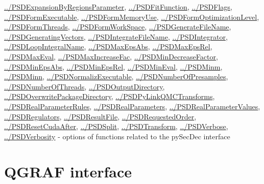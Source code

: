 \documentclass[../FeynHelpersManual.tex]{subfiles}
\begin{document}
\begin{itemize}
  \hyperlink{../psdexpansionbyregionsparameter}{../PSDExpansionByRegionsParameter},
  \hyperlink{../psdfitfunction}{../PSDFitFunction},
  \hyperlink{../psdflags}{../PSDFlags},
  \hyperlink{../psdformexecutable}{../PSDFormExecutable},
  \hyperlink{../psdformmemoryuse}{../PSDFormMemoryUse},
  \hyperlink{../psdformoptimizationlevel}{../PSDFormOptimizationLevel},
  \hyperlink{../psdformthreads}{../PSDFormThreads},
  \hyperlink{../psdformworkspace}{../PSDFormWorkSpace},
  \hyperlink{../psdgeneratefilename}{../PSDGenerateFileName},
  \hyperlink{../psdgeneratingvectors}{../PSDGeneratingVectors},
  \hyperlink{../psdintegratefilename}{../PSDIntegrateFileName},
  \hyperlink{../psdintegrator}{../PSDIntegrator},
  \hyperlink{../psdloopintegralname}{../PSDLoopIntegralName},
  \hyperlink{../psdmaxepsabs}{../PSDMaxEpsAbs},
  \hyperlink{../psdmaxepsrel}{../PSDMaxEpsRel},
  \hyperlink{../psdmaxeval}{../PSDMaxEval},
  \hyperlink{../psdmaxincreasefac}{../PSDMaxIncreaseFac},
  \hyperlink{../psdmindecreasefactor}{../PSDMinDecreaseFactor},
  \hyperlink{../psdminepsabs}{../PSDMinEpsAbs},
  \hyperlink{../psdminepsrel}{../PSDMinEpsRel},
  \hyperlink{../psdmineval}{../PSDMinEval},
  \hyperlink{../psdminm}{../PSDMinm},
  \hyperlink{../psdminn}{../PSDMinn},
  \hyperlink{../psdnormalizexecutable}{../PSDNormalizExecutable},
  \hyperlink{../psdnumberofpresamples}{../PSDNumberOfPresamples},
  \hyperlink{../psdnumberofthreads}{../PSDNumberOfThreads},
  \hyperlink{../psdoutputdirectory}{../PSDOutputDirectory},
  \hyperlink{../psdoverwritepackagedirectory}{../PSDOverwritePackageDirectory},
  \hyperlink{../psdpylinkqmctransforms}{../PSDPyLinkQMCTransforms},
  \hyperlink{../psdrealparameterrules}{../PSDRealParameterRules},
  \hyperlink{../psdrealparameters}{../PSDRealParameters},
  \hyperlink{../psdrealparametervalues}{../PSDRealParameterValues},
  \hyperlink{../psdregulators}{../PSDRegulators},
  \hyperlink{../psdresultfile}{../PSDResultFile},
  \hyperlink{../psdrequestedorder}{../PSDRequestedOrder},
  \hyperlink{../psdresetcudaafter}{../PSDResetCudaAfter},
  \hyperlink{../psdsplit}{../PSDSplit},
  \hyperlink{../psdtransform}{../PSDTransform},
  \hyperlink{../psdverbose}{../PSDVerbose},
  \hyperlink{../psdverbosity}{../PSDVerbosity} - options of functions
  related to the pySecDec interface
\end{itemize}

\hypertarget{qgraf interface}{
\section{QGRAF interface}\label{qgraf interface}}
\end{document}
